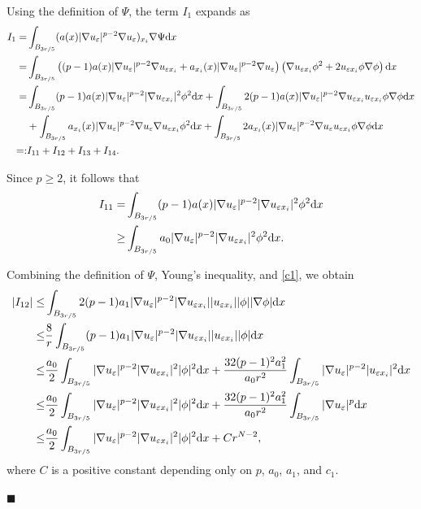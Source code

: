 \documentclass[onecolumn]{autart}
\newenvironment{proof}{{\it Proof: \enspace}}{\hfill $\blacksquare$\par}
\begin{document}
\begin{proof}
		Using the definition of $\Psi$, the term $I_1$ expands as
		\begin{align}
			I_1
			=
			&\int_{B_{3r/5}}(a(x)|\nabla u_\varepsilon|^{p-2}\nabla u_\varepsilon)_{x_i} \nabla \Psi \mathrm{d}x
			\notag \\ =
			&\int_{B_{3r/5}}\left((p-1) a(x)  |\nabla u_\varepsilon|^{p-2} \nabla u_{\varepsilon x_i}+ a_{x_i}(x) |\nabla u_\varepsilon|^{p-2} \nabla u_\varepsilon \right)\left(\nabla u_{\varepsilon x_i}\phi^2 +2 u_{\varepsilon x_i}\phi\nabla \phi \right) \mathrm{d}x
			\notag \\ =
			&\int_{B_{3r/5}} (p-1) a(x)  |\nabla u_\varepsilon|^{p-2} |\nabla u_{\varepsilon x_i}|^2\phi^2\mathrm{d}x +\int_{B_{3r/5}}2(p-1) a(x)  |\nabla u_\varepsilon|^{p-2} \nabla u_{\varepsilon x_i} u_{\varepsilon x_i} \phi\nabla \phi\mathrm{d}x
			\notag \\
			&+\int_{B_{3r/5}} a_{x_i}(x) |\nabla u_\varepsilon|^{p-2} \nabla u_\varepsilon \nabla u_{\varepsilon x_i}\phi^2\mathrm{d}x + \int_{B_{3r/5}} 2a_{x_i}(x) |\nabla u_\varepsilon|^{p-2} \nabla u_{\varepsilon} u_{\varepsilon x_i}\phi\nabla \phi \mathrm{d}x
			\notag\\ =
			:&I_{11}+I_{12}+I_{13}+I_{14}. \label{5.6}
		\end{align}
		
		Since $p \geq 2$, it follows that
		\begin{align}
			I_{11}
			=
			&\int_{B_{3r/5}} (p-1) a(x)  |\nabla u_\varepsilon|^{p-2} |\nabla u_{\varepsilon x_i}|^2\phi^2\mathrm{d}x
			\notag \\ \geq
			&\int_{B_{3r/5}}  a_0  |\nabla u_\varepsilon|^{p-2} |\nabla u_{\varepsilon x_i}|^2\phi^2\mathrm{d}x. \label{5.7}
		\end{align}
		
		Combining the definition of $\Psi$, Young's inequality, and \eqref{c1}, we obtain
		\begin{align}
			|I_{12}|
			\leq
			&\int_{B_{3r/5}}2(p-1) a_1  |\nabla u_\varepsilon|^{p-2} |\nabla u_{\varepsilon x_i}| |u_{\varepsilon x_i}| |\phi||\nabla \phi|\mathrm{d}x
			\notag \\ \leq
			& \frac{8}{r}\int_{B_{3r/5}}(p-1) a_1  |\nabla u_\varepsilon|^{p-2} |\nabla u_{\varepsilon x_i}| |u_{\varepsilon x_i}| |\phi|\mathrm{d}x
			\notag \\ \leq
			& \frac{a_0}{2}\int_{B_{3r/5}}  |\nabla u_\varepsilon|^{p-2} |\nabla u_{\varepsilon x_i}|^2  |\phi|^2\mathrm{d}x + \frac{32(p-1)^2 a_1^2}{a_0 r^2}\int_{B_{3r/5}}  |\nabla u_\varepsilon|^{p-2} | u_{\varepsilon x_i}|^2 \mathrm{d}x
			\notag \\ \leq
			& \frac{a_0}{2}\int_{B_{3r/5}}  |\nabla u_\varepsilon|^{p-2} |\nabla u_{\varepsilon x_i}|^2  |\phi|^2\mathrm{d}x + \frac{32(p-1)^2 a_1^2}{a_0 r^2}\int_{B_{3r/5}}  |\nabla u_\varepsilon|^p \mathrm{d}x
			\notag \\ \leq
			& \frac{a_0}{2}\int_{B_{3r/5}}  |\nabla u_\varepsilon|^{p-2} |\nabla u_{\varepsilon x_i}|^2  |\phi|^2\mathrm{d}x + Cr^{N-2},\label{5.8}
		\end{align}
		where $C$ is a positive  constant depending only on $p$, $a_0$, $a_1$, and $c_1$.
		

\end{proof}
\end{document}
